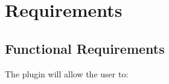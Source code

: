 
\section{Requirements}
\label{sec:requirements}


\subsection{Functional Requirements}
\label{sub:functional_requirements}


The plugin will allow the user to:


